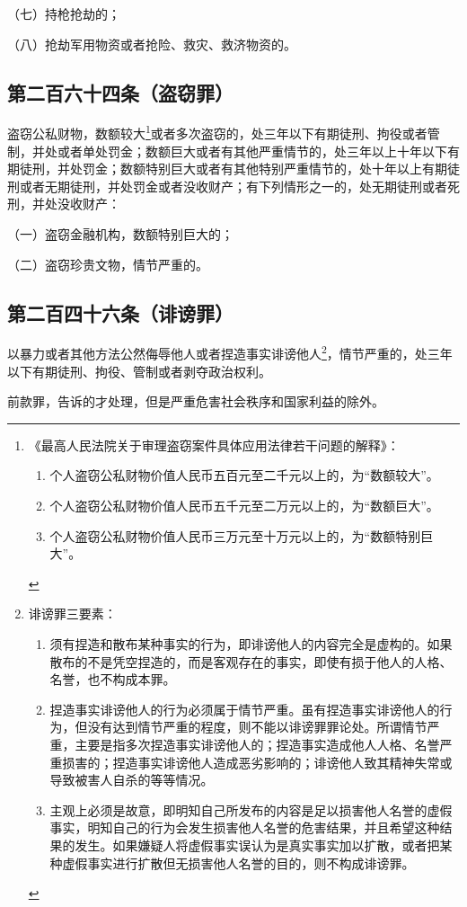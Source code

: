 \documentclass[utf-8,10pt]{ctexart}
\begin{document}
（七）持枪抢劫的；

（八）抢劫军用物资或者抢险、救灾、救济物资的。
\subsection{第二百六十四条（盗窃罪）}
盗窃公私财物，数额较大\footnote{
《最高人民法院关于审理盗窃案件具体应用法律若干问题的解释》：
\begin{enumerate}
\item 个人盗窃公私财物价值人民币五百元至二千元以上的，为“数额较大”。
\item 个人盗窃公私财物价值人民币五千元至二万元以上的，为“数额巨大”。
\item 个人盗窃公私财物价值人民币三万元至十万元以上的，为“数额特别巨大”。 
\end{enumerate}
}或者多次盗窃的，处三年以下有期徒刑、拘役或者管制，并处或者单处罚金；数额巨大或者有其他严重情节的，处三年以上十年以下有期徒刑，并处罚金；数额特别巨大或者有其他特别严重情节的，处十年以上有期徒刑或者无期徒刑，并处罚金或者没收财产；有下列情形之一的，处无期徒刑或者死刑，并处没收财产：

（一）盗窃金融机构，数额特别巨大的；

（二）盗窃珍贵文物，情节严重的。
\subsection{第二百四十六条（诽谤罪）}
以暴力或者其他方法公然侮辱他人或者捏造事实诽谤他人\footnote{
诽谤罪三要素：
\begin{enumerate}
\item 须有捏造和散布某种事实的行为，即诽谤他人的内容完全是虚构的。如果散布的不是凭空捏造的，而是客观存在的事实，即使有损于他人的人格、名誉，也不构成本罪。
\item 捏造事实诽谤他人的行为必须属于情节严重。虽有捏造事实诽谤他人的行为，但没有达到情节严重的程度，则不能以诽谤罪罪论处。所谓情节严重，主要是指多次捏造事实诽谤他人的；捏造事实造成他人人格、名誉严重损害的；捏造事实诽谤他人造成恶劣影响的；诽谤他人致其精神失常或导致被害人自杀的等等情况。
\item 主观上必须是故意，即明知自己所发布的内容是足以损害他人名誉的虚假事实，明知自己的行为会发生损害他人名誉的危害结果，并且希望这种结果的发生。如果嫌疑人将虚假事实误认为是真实事实加以扩散，或者把某种虚假事实进行扩散但无损害他人名誉的目的，则不构成诽谤罪。
\end{enumerate}
}，情节严重的，处三年以下有期徒刑、拘役、管制或者剥夺政治权利。

前款罪，告诉的才处理，但是严重危害社会秩序和国家利益的除外。
\end{document}
